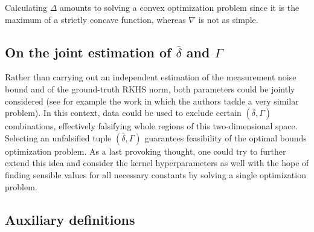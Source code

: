 Calculating $\Delta$ amounts to solving a convex optimization problem since it is the maximum of a strictly concave function, whereas $\nabla$ is not as simple.


\subsection{On the joint estimation of $\bar\delta$ and $\Gamma$}
\label{sec.joint_estimation}

Rather than carrying out an independent estimation of the measurement noise bound and of the ground-truth RKHS norm, both parameters could be jointly considered (see for example the work \cite[§3]{milanese2004set} in which the authors tackle a very similar problem). In this context, data could be used to exclude certain $(\bar\delta,\Gamma)$ combinations, effectively falsifying whole regions of this two-dimensional space. Selecting an unfalsified tuple $(\bar\delta,\Gamma)$ guarantees feasibility of the optimal bounds optimization problem. As a last provoking thought, one could try to further extend this idea and consider the kernel hyperparameters as well with the hope of finding sensible values for all necessary constants by solving a single optimization problem.

\subsection{Auxiliary definitions}
\label{sec.auxiliary_definitions}

